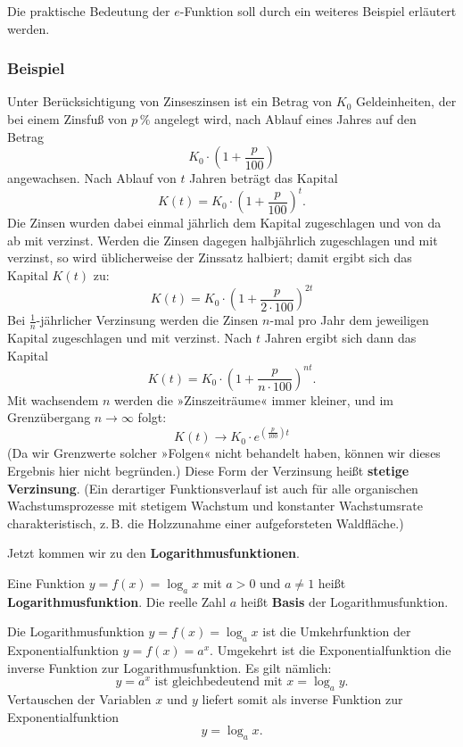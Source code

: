 Die praktische Bedeutung der $e$-Funktion soll durch ein weiteres Beispiel erläutert werden.

\subsubsection{Beispiel}

Unter Berücksichtigung von Zinseszinsen ist ein Betrag von $K_0$ Geldeinheiten, der bei einem Zinsfuß von $p\,\%$ angelegt wird, nach Ablauf eines Jahres auf den Betrag
\[ K_0 \cdot \left(1 + \frac{p}{100}\right) \]
angewachsen. Nach Ablauf von $t$ Jahren beträgt das Kapital
\[ K(t) = K_0 \cdot \left(1 + \frac{p}{100}\right)^t . \]
Die Zinsen wurden dabei einmal jährlich dem Kapital zugeschlagen und von da ab mit verzinst. Werden die Zinsen dagegen halbjährlich zugeschlagen und mit verzinst, so wird üblicherweise der Zinssatz halbiert; damit ergibt sich das Kapital $K(t)$ zu:
\[ K(t) = K_0 \cdot \left(1 + \frac{p}{2 \cdot 100}\right)^{2t} \]
Bei $\tfrac{1}{n}$-jährlicher Verzinsung werden die Zinsen $n$-mal pro Jahr dem jeweiligen Kapital zugeschlagen und mit verzinst. Nach $t$ Jahren ergibt sich dann das Kapital
\[ K(t) = K_0 \cdot \left(1 + \frac{p}{n \cdot 100}\right)^{nt} . \]
Mit wachsendem $n$ werden die »Zinszeiträume« immer kleiner, und im Grenzübergang $n \rightarrow \infty$ folgt:
\[ K(t) \rightarrow K_0 \cdot e^{\left(\frac{p}{100}\right) t} \]
(Da wir Grenzwerte solcher »Folgen« nicht behandelt haben, können wir dieses Ergebnis hier nicht begründen.)
Diese Form der Verzinsung heißt \textbf{stetige Verzinsung}. (Ein derartiger Funktionsverlauf ist auch für alle organischen Wachstumsprozesse mit stetigem Wachstum und konstanter Wachstumsrate charakteristisch, z.\,B. die Holzzunahme einer aufgeforsteten Waldfläche.)\beispielende


Jetzt kommen wir zu den \textbf{Logarithmusfunktionen}.

Eine Funktion $y = f(x) = \log_a x$ mit $a > 0$ und $a \neq 1$ heißt \textbf{Logarithmusfunktion}. Die reelle Zahl $a$ heißt \textbf{Basis} der Logarithmusfunktion.

Die Logarithmusfunktion $y = f(x) = \log_a x$ ist die Umkehrfunktion der Exponentialfunktion $y = f(x) = a^x$. Umgekehrt ist die Exponentialfunktion die inverse Funktion zur Logarithmusfunktion. Es gilt nämlich:
\[ y = a^x \text{ ist gleichbedeutend mit } x = \log_a y . \]
Vertauschen der Variablen $x$ und $y$ liefert somit als inverse Funktion zur Exponentialfunktion
\[ y = \log_a x . \]

